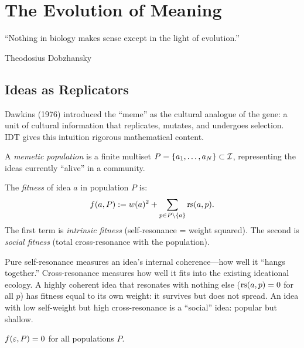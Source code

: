 \chapter{The Evolution of Meaning}
\label{ch:evolution-deep}

\epigraph{``Nothing in biology makes sense except in the light of evolution.''}%
{Theodosius Dobzhansky}


\section{Ideas as Replicators}

Dawkins (1976) introduced the ``meme'' as the cultural analogue of the gene:
a unit of cultural information that replicates, mutates, and undergoes
selection.  IDT gives this intuition rigorous mathematical content.

\begin{definition}
\label{def:memetic-population}
A \emph{memetic population} is a finite multiset $P = \{a_1, \ldots, a_N\}
\subset \mathcal{I}$, representing the ideas currently ``alive'' in a community.
\end{definition}

\begin{definition}
\label{def:fitness}
The \emph{fitness} of idea $a$ in population $P$ is:
\[
  f(a, P) := w(a)^2 + \sum_{p \in P \setminus \{a\}} \mathrm{rs}(a, p).
\]
The first term is \emph{intrinsic fitness} (self-resonance = weight squared).
The second is \emph{social fitness} (total cross-resonance with the
population).
\end{definition}

\begin{remark}
Pure self-resonance measures an idea's internal coherence---how well it
``hangs together.''  Cross-resonance measures how well it fits into the
existing ideational ecology.  A highly coherent idea that resonates with
nothing else ($\mathrm{rs}(a, p) = 0$ for all $p$) has fitness equal to its own
weight: it survives but does not spread.  An idea with low self-weight but
high cross-resonance is a ``social'' idea: popular but shallow.
\end{remark}

\begin{theorem}
\label{thm:void-fitness}
$f(\varepsilon, P) = 0$ for all populations $P$.
\end{theorem}

